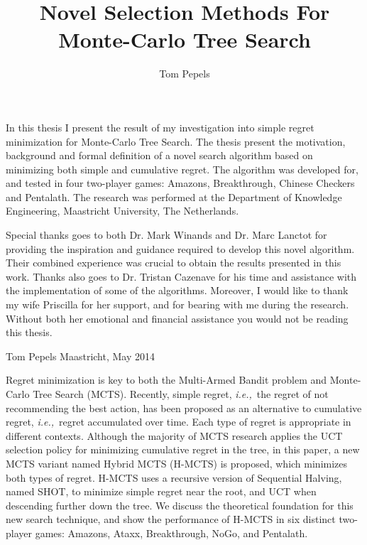 \documentclass{kecsmstr}
\title{Novel Selection Methods For Monte-Carlo Tree Search}
\author{Tom Pepels}
\newcommand{\ie}{{\it i.e.,}~}
\begin{document}
\makeheaders {} \maketitle \setcounter{page}{2}
\emptypage

In this thesis I present the result of my investigation into simple regret minimization for Monte-Carlo Tree Search. The thesis present the motivation, background and formal definition of a novel search algorithm based on minimizing both simple and cumulative regret. The algorithm was developed for, and tested in four two-player games: Amazons, Breakthrough, Chinese Checkers and Pentalath. The research was performed at the Department of Knowledge Engineering, Maastricht University, The Netherlands.

Special thanks goes to both Dr. Mark Winands and Dr. Marc Lanctot for providing the inspiration and guidance required to develop this novel algorithm. Their combined experience was crucial to obtain the results presented in this work. Thanks also goes to Dr. Tristan Cazenave for his time and assistance with the implementation of some of the algorithms. Moreover, I would like to thank my wife Priscilla for her support, and for  bearing with me during the research. Without both her emotional and financial assistance you would not be reading this thesis.
\newline \newline

\noindent Tom Pepels \newline
Maastricht, May 2014
\emptypage

 Regret minimization is key to both the Multi-Armed Bandit problem and Monte-Carlo Tree Search (MCTS). Recently, simple regret, \ie the regret of not recommending the best action, has been proposed as an alternative to cumulative regret, \ie regret accumulated over time. Each type of regret is appropriate in different contexts. Although the majority of MCTS research applies the UCT selection policy for minimizing cumulative regret in the tree, in this paper, a new MCTS variant named Hybrid MCTS (H-MCTS) is proposed, which minimizes both types of regret. H-MCTS uses a recursive version of Sequential Halving, named SHOT, to minimize simple regret near the root, and UCT when descending further down the tree. We discuss the theoretical foundation for this new search technique, and show the performance of H-MCTS in six distinct two-player games: Amazons, Ataxx, Breakthrough, NoGo, and Pentalath. \emptypage
\end{document}
